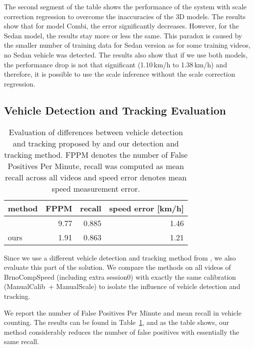\documentclass[]{elsarticle}
\newlength{\tabwidth}
\newcommand{\ManualCalib}{ManualCalib}
\newcommand{\ManualScale}{ManualScale}
\begin{document}
The second segment of the table shows the performance of the system with scale correction regression to overcome the inaccuracies of the 3D models. The results show that for model Combi, the error significantly decreases. However, for the Sedan model, the results stay more or less the same. This paradox is caused by the smaller number of training data for Sedan version as for some training videos, no Sedan vehicle was detected.
The results also show that if we use both models, the performance drop is not that significant (1.10\,km/h to 1.38\,km/h) and therefore, it is possible to use the scale inference without the scale correction regression.


\subsection{Vehicle Detection and Tracking Evaluation} \label{sec:TrackingEval}

\begin{table}[t]
	\centering
	\caption{Evaluation of differences between vehicle detection and tracking proposed by  \cite{Dubska2014} and our detection and tracking method. FPPM denotes the number of False Positives Per Minute, recall was computed as mean recall across all videos and speed error denotes mean speed measurement error.}  \label{tab:CountingResults}
	\vspace{2mm}
	\setlength{\tabwidth}{0.90\linewidth}
	\small
	\begin{tabular}{l r r r}
		\toprule
		\textbf{method} & \textbf{FPPM} & \textbf{recall} & \textbf{speed error [km/h]}\\
		\midrule
		\cite{Dubska2014} & 9.77 & 0.885 & 1.46\\
		ours & 1.91 & 0.863 & 1.21\\	
		\bottomrule
	\end{tabular}
\end{table}


Since we use a different vehicle detection and tracking method from \cite{Dubska2014}, we also evaluate this part of the solution. We compare the methods on all videos of BrnoCompSpeed (including extra session0) with exactly the same calibration (\ManualCalib\ + \ManualScale) to isolate the influence of vehicle detection and tracking. 

We report the number of False Positives Per Minute and mean recall in vehicle counting. The results can be found in Table~\ref{tab:CountingResults}, and as the table shows, our method considerably reduces the number of false positives with essentially the same recall.
\end{document}
